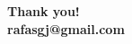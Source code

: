 \documentclass[aspectratio=169,14pt]{beamer}
\begin{document}
{
\begin{frame}
    \begin{flushright}
    \huge \textbf{Thank you!} \\
    \vfill
    \small \textbf{rafasgj@gmail.com}
    \end{flushright}
\end{frame}
}
\end{document}
